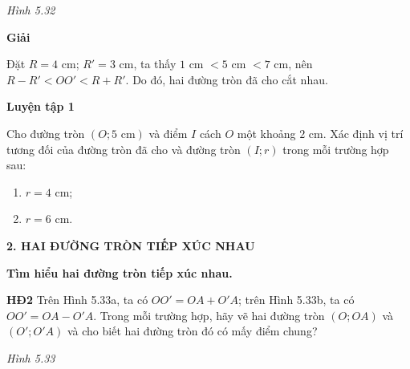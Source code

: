 \begin{lesson}
\begin{center}
        \textit{Hình 5.32}
    \end{center}

    \textbf{Giải}

    Đặt $R=4$ cm; $R'=3$ cm, ta thấy $1$ cm $<5$ cm $<7$ cm, nên $R-R'<OO'<R+R'$. Do đó, hai đường tròn đã cho cắt nhau.

    \textbf{Luyện tập 1}

    Cho đường tròn $(O;5\text{ cm})$ và điểm $I$ cách $O$ một khoảng $2$ cm. Xác định vị trí tương đối của đường tròn đã cho và đường tròn $(I;r)$ trong mỗi trường hợp sau:
    \begin{enumerate}[label=\alph*)]
        \item $r=4$ cm;
        \item $r=6$ cm.
    \end{enumerate}

    \answerline
    \answerline

    \textbf{2. HAI ĐƯỜNG TRÒN TIẾP XÚC NHAU}

    \textbf{Tìm hiểu hai đường tròn tiếp xúc nhau.}

    \textbf{HĐ2} Trên Hình 5.33a, ta có $OO'=OA+O'A$; trên Hình 5.33b, ta có $OO'=OA-O'A$. Trong mỗi trường hợp, hãy vẽ hai đường tròn $(O;OA)$ và $(O';O'A)$ và cho biết hai đường tròn đó có mấy điểm chung?

    \begin{center}

        \textit{Hình 5.33}
    \end{center}


\end{lesson}
